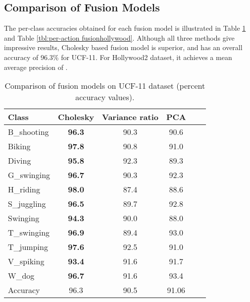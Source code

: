 \subsection{Comparison of Fusion Models}
The per-class accuracies obtained for each fusion model is illustrated in Table \ref{tbl:per-action fusionucf} and
Table \ref{tbl:per-action fusionhollywood}. Although all three methods give impressive results, Cholesky based fusion
model is superior, and has an overall accuracy of 96.3\% for UCF-11. For Hollywood2 dataset, it achieves a mean average precision
of .


\begin{table}[]
\centering
\caption{Comparison of fusion models on UCF-11 dataset (percent accuracy values).}\label{tbl:per-action fusionucf}
\begin{tabular}{@{} l c c c c r @{} }
\toprule
Class            & Cholesky & Variance ratio & PCA   \\ \midrule  \midrule
B\_shooting       & \textbf{96.3}    &  90.3   &  90.6  \\
Biking           & \textbf{97.8}    &  90.8   &  91.0    \\
Diving           & \textbf{95.8}    &  92.3   &  89.3   \\
G\_swinging       & \textbf{96.7}    &  90.3   &  92.3   \\
H\_riding         & \textbf{98.0}    &  87.4   &  88.6    \\
S\_juggling       & \textbf{96.5}    &  89.7   &  92.8   \\
Swinging         & \textbf{94.3}    &  90.0   &  88.0    \\
T\_swinging       & \textbf{96.9}    &  89.4   &  93.0   \\
T\_jumping        & \textbf{97.6}    &  92.5   &  91.0    \\
V\_spiking        &\textbf{93.4}    &  91.6   &  91.7   \\
W\_dog            & \textbf{96.7}    &  91.6   &  93.4   \\ \midrule
Accuracy &  96.3   &  90.5   &   91.06   \\ \bottomrule
\end{tabular}
\end{table}

